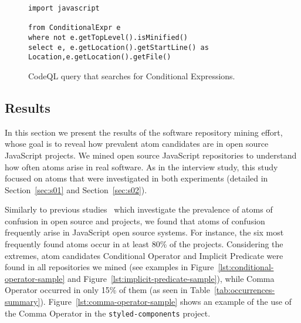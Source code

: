 \begin{figure}
\begin{lstlisting}[language=CodeQL]
import javascript

from ConditionalExpr e
where not e.getTopLevel().isMinified() 
select e, e.getLocation().getStartLine() as Location,e.getLocation().getFile()
\end{lstlisting}
\caption{CodeQL query that searches for Conditional Expressions.}
\label{lst:codeql}
\end{figure}



\subsection{Results}
\label{sec:msr-results} 

In this section we present the results of the  software repository
mining effort, whose goal is to reveal how prevalent atom candidates are in open source JavaScript projects. 
We mined \minedprojects open source JavaScript repositories to understand how
often atoms arise in real software. As in the interview study, this study focused on atoms that were investigated in both
experiments (detailed in Section~\ref{sec:s01} and Section~\ref{sec:s02}).  


Similarly to previous studies~\cite{DBLP:conf/msr/GopsteinZFC18,DBLP:journals/ese/MedeirosLAAKRG19} which investigate
the prevalence of atoms of confusion in open source \clang and \cpplang projects, we found that atoms of confusion
frequently arise in JavaScript open source systems. For instance, the six most frequently found atoms
occur in at least 80\% of the projects. Considering the extremes, atom candidates Conditional Operator and
Implicit Predicate were found in all repositories we mined (see examples in Figure~\ref{lst:conditional-operator-sample}
and Figure~\ref{lst:implicit-predicate-sample}), while Comma Operator occurred in only 15\% of them (as seen in Table~\ref{tab:occurrences-summary}).
Figure~\ref{lst:comma-operator-sample} shows an example of the use of the Comma Operator in the \texttt{styled-components}
project.


